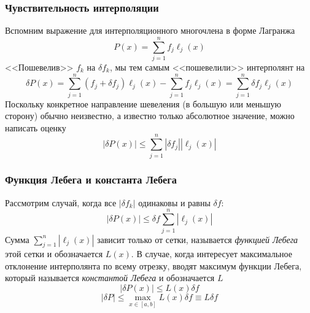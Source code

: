 \documentclass[aspectratio=169,unicode]{beamer}
\begin{document}
\begin{frame}
\frametitle{Чувствительность интерполяции}
	Вспомним выражение для интерполяционного многочлена в форме Лагранжа
	\[
	P(x) = \sum_{j=1}^n f_j \ell_j(x)
	\]
	<<Пошевелив>> $f_k$ на $\delta f_k$, мы тем самым <<пошевелили>> интерполянт на
	\[
	\delta P(x) = \sum_{j=1}^n (f_j+\delta f_j) \ell_j(x) - \sum_{j=1}^n f_j \ell_j(x) = \sum_{j=1}^n \delta f_j \ell_j(x)
	\]
	Поскольку конкретное направление шевеления (в большую или меньшую сторону) обычно неизвестно, а известно только
	абсолютное значение, можно написать оценку
	\[
	|\delta P(x)| \leqslant \sum_{j=1}^n |\delta f_j| |\ell_j(x)|
	\]
\end{frame}

\begin{frame}
\frametitle{Функция Лебега и константа Лебега}
	Рассмотрим случай, когда все $|\delta f_k|$ одинаковы и равны $\delta f$:
	\[
	|\delta P(x)| \leqslant \delta f \sum_{j=1}^n |\ell_j(x)|
	\]
	Сумма $\sum_{j=1}^n |\ell_j(x)|$ зависит только от сетки, называется \emph{функцией Лебега} этой сетки и обозначается $L(x)$.
	В случае, когда интересует максимальное отклонение интерполянта по всему отрезку, вводят максимум функции Лебега,
	который называется \emph{константой Лебега} и обозначается $L$
	\[
	|\delta P(x)| \leqslant L(x) \delta f
	\]
	\[
	|\delta P| \leqslant \max_{x \in [a,b]} L(x)  \delta f \equiv L \delta f
	\]
\end{frame}
\end{document}
